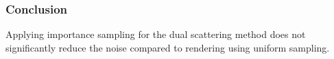 \documentclass{beamer}
\begin{document}
  \begin{frame}
  \frametitle{Conclusion}
  
  Applying importance sampling for the dual scattering method does not significantly reduce the noise compared to rendering using uniform sampling.
  \end{frame}
  
\end{document}
